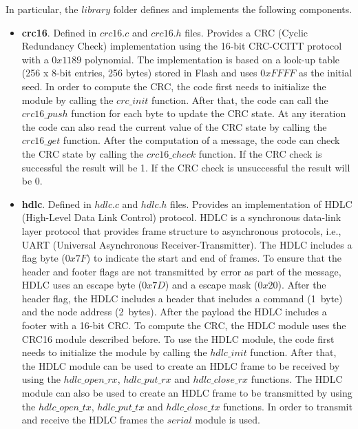 In particular, the $library$ folder defines and implements the following components.
\begin{itemize}
\item \textbf{crc16}. Defined in $crc16.c$ and $crc16.h$ files. Provides a CRC (Cyclic Redundancy Check) implementation using the 16-bit CRC-CCITT protocol with a $0x1189$ polynomial. The implementation is based on a look-up table (256 x 8-bit entries, 256 bytes) stored in Flash and uses $0xFFFF$ as the initial seed. In order to compute the CRC, the code first needs to initialize the module by calling the $crc\_init$ function. After that, the code can call the $crc16\_push$ function for each byte to update the CRC state. At any iteration the code can also read the current value of the CRC state by calling the $crc16\_get$ function. After the computation of a message, the code can check the CRC state by calling the $crc16\_check$ function. If the CRC check is successful the result will be 1. If the CRC check is unsuccessful the result will be 0. 

\item \textbf{hdlc}. Defined in $hdlc.c$ and $hdlc.h$ files. Provides an implementation of HDLC (High-Level Data Link Control) protocol. HDLC is a synchronous data-link layer protocol that provides frame structure to asynchronous protocols, i.e., UART (Universal Asynchronous Receiver-Transmitter). The HDLC includes a flag byte ($0x7F$) to indicate the start and end of frames. To ensure that the header and footer flags are not transmitted by error as part of the message, HDLC uses an escape byte ($0x7D$) and a escape mask ($0x20$). After the header flag, the HDLC includes a header that includes a command (1~byte) and the node address (2~bytes). After the payload the HDLC includes a footer with a 16-bit CRC. To compute the CRC, the HDLC module uses the CRC16 module described before. To use the HDLC module, the code first needs to initialize the module by calling the $hdlc\_init$ function. After that, the HDLC module can be used to create an HDLC frame to be received by using the $hdlc\_open\_rx$, $hdlc\_put\_rx$ and $hdlc\_close\_rx$ functions. The HDLC module can also be used to create an HDLC frame to be transmitted by using the $hdlc\_open\_tx$, $hdlc\_put\_tx$ and $hdlc\_close\_tx$ functions. In order to transmit and receive the HDLC frames the $serial$ module is used.


\end{itemize}
